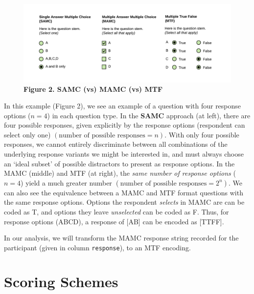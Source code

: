 \documentclass[
  letterpaper,
  DIV=11,
  numbers=noendperiod]{scrreprt}
\begin{document}
\begin{figure}

{\centering \includegraphics{analysis/SGC3A/static/img/MAMC-MTF.png}

}

\caption{\textbf{Figure 2. SAMC (vs) MAMC (vs) MTF}}

\end{figure}

In this example (Figure 2), we see an example of a question with four
response options (\(n=4\)) in each question type. In the \textbf{SAMC}
approach (at left), there are four possible responses, given explicitly
by the response options (respondent can select only one)
\((\text{number of possible responses} = n)\). With only four possible
responses, we cannot entirely discriminate between all combinations of
the underlying response variants we might be interested in, and must
always choose an `ideal subset' of possible distractors to present as
response options. In the MAMC (middle) and MTF (at right), the
\emph{same number of response options} (\(n=4\)) yield a much greater
number \((\text{number of possible responses} = 2^{n})\). We can also
see the equivalence between a MAMC and MTF format questions with the
same response options. Options the respondent \emph{selects} in MAMC are
can be coded as T, and options they leave \emph{unselected} can be coded
as F. Thus, for response options (ABCD), a response of {[}AB{]} can be
encoded as {[}TTFF{]}.

\begin{tcolorbox}[standard jigsaw, leftrule=.75mm, bottomrule=.15mm, colframe=quarto-callout-color-frame, rightrule=.15mm, toprule=.15mm, left=2mm, arc=.35mm, opacityback=0, colback=white]
In our analysis, we will transform the MAMC response string recorded for
the participant (given in column \texttt{response}), to an MTF encoding.
\end{tcolorbox}

\hypertarget{scoring-schemes}{%
\section{Scoring Schemes}\label{scoring-schemes}}
\end{document}
